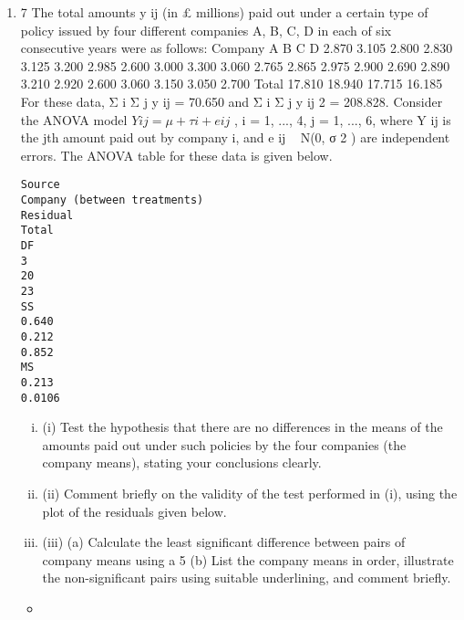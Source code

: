 \documentclass[a4paper,12pt]{article}
\begin{document}
\begin{enumerate}
\item
7
The total amounts y ij (in £ millions) paid out under a certain type of policy issued by four different companies A, B, C, D in each of six consecutive years were as follows:
Company
A
B
C
D
2.870
3.105
2.800
2.830
3.125
3.200
2.985
2.600
3.000
3.300
3.060
2.765
2.865
2.975
2.900
2.690
2.890
3.210
2.920
2.600
3.060
3.150
3.050
2.700
Total
17.810
18.940
17.715
16.185
For these data, Σ i Σ j y ij = 70.650 and Σ i Σ j y ij 2 = 208.828.
Consider the ANOVA model $Y ij = μ + τ i + e ij$ , i = 1, ..., 4, j = 1, ..., 6, where Y ij is the
jth amount paid out by company i, and e ij ~ N(0, σ 2 ) are independent errors.
The ANOVA table for these data is given below.

\begin{verbatim}
Source
Company (between treatments)
Residual
Total
DF
3
20
23
SS
0.640
0.212
0.852
MS
0.213
0.0106
\end{verbatim}

\begin{enumerate}[(i)]
\item (i) Test the hypothesis that there are no differences in the means of the amounts paid out under such policies by the four companies (the company means), stating your conclusions clearly.
\item 
(ii) Comment briefly on the validity of the test performed in (i), using the plot of the residuals given below.
\item
(iii) (a)
Calculate the least significant difference between pairs of company means using a 5%
(b)
List the company means in order, illustrate the non-significant pairs using suitable underlining, and comment briefly.
\end{enumerate}
 \begin{itemize}
     \item 


\end{itemize}
\end{enumerate}
\end{document}
